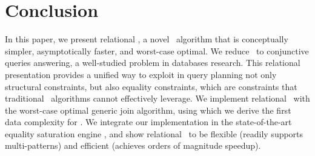 \section{Conclusion}
\label{sec:conclusion}

In this paper, we present relational \ematching, a novel \ematching~algorithm
 that is conceptually simpler, asymptotically faster, and worst-case optimal.
We reduce \ematching\ to conjunctive queries answering,
 a well-studied problem in databases research.
This relational presentation provides a unified way
 to exploit in query planning not only structural constraints,
 but also equality constraints,
 which are constraints that traditional \ematching\ algorithms cannot effectively leverage.
We implement relational \ematching\ with the worst-case optimal generic join algorithm,
 using which we derive the first data complexity for \ematching.
We integrate our implementation in the state-of-the-art equality saturation engine
\egg, and show relational \ematching\ to be flexible (readily supports multi-patterns)
and efficient (achieves orders of magnitude speedup).
